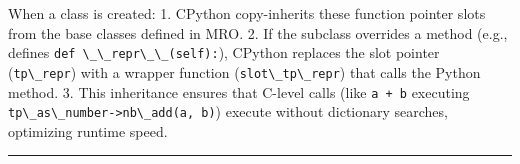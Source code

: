 When a class is created: 1. CPython copy-inherits these function pointer
slots from the base classes defined in MRO. 2. If the subclass overrides
a method (e.g., defines
\passthrough{\lstinline!def \_\_repr\_\_(self):!}), CPython replaces the
slot pointer (\passthrough{\lstinline!tp\_repr!}) with a wrapper
function (\passthrough{\lstinline!slot\_tp\_repr!}) that calls the
Python method. 3. This inheritance ensures that C-level calls (like
\passthrough{\lstinline!a + b!} executing
\passthrough{\lstinline!tp\_as\_number->nb\_add(a, b)!}) execute without
dictionary searches, optimizing runtime speed.

\begin{center}\rule{0.5\linewidth}{0.5pt}\end{center}
